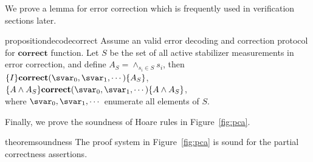 We prove a lemma for error correction which is frequently used in verification sections later.
\nothmskip
\begin{restatable}{proposition}{decodecorrect}
\label{prop:decodecorrect}
Assume an valid error decoding and correction protocol for $\textbf{correct}$ function. Let $S$ be the set of all active stabilizer measurements in error correction, and  define $ A_S = \wedge_{s_i \in S} s_i$, then \\
$\{I \}\textbf{correct}(\svar_0, \svar_1, \cdots) \{ A_S\}$,\\
$\{A \wedge A_S \}\textbf{correct}(\svar_0, \svar_1, \cdots) \{A \wedge A_S\}$,\\ where $\svar_0, \svar_1, \cdots$ enumerate all elements of $S$.
\end{restatable}

Finally, we prove the soundness of Hoare rules in Figure~\ref{fig:pca}. %
\begin{restatable}[Soundness]{theorem}{soundness}
\label{thm:soundness}
The proof system in Figure~\ref{fig:pca} is sound for the partial correctness assertions.
\end{restatable}\nothmskip
{}
